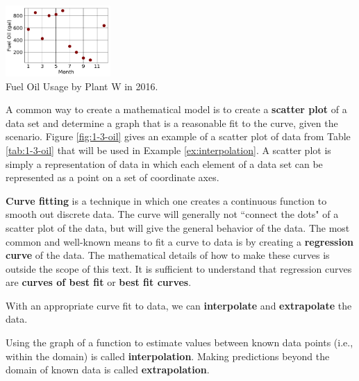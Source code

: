 \begin{floatingfigure}{0.3\textwidth}
    \centering
    \includegraphics[width=0.3\textwidth]{img/chap1/sec1-3/ex1-3-oil.png}\\
    \caption{Fuel Oil Usage by Plant W in 2016.}
    \label{fig:1-3-oil}
\end{floatingfigure}
A common way to create a mathematical model is to create a {\bf scatter plot} of a data set and determine a graph that is a reasonable fit to the curve, given the scenario. Figure \ref{fig:1-3-oil} gives an example of a scatter plot of data from Table \ref{tab:1-3-oil} that will be used in Example \ref{ex:interpolation}. A scatter plot is simply a representation of data in which each element of a data set can be represented as a point on a set of coordinate axes.

{\bf Curve fitting} is a technique in which one creates a continuous function to smooth out discrete data. The curve will generally not ``connect the dots" of a scatter plot of the data, but will give the general behavior of the data. The most common and well-known means to fit a curve to data is by creating a {\bf regression curve} of the data. The mathematical details of how to make these curves is outside the scope of this text. It is sufficient to understand that regression curves are {\bf curves of best fit} or {\bf best fit curves}.


With an appropriate curve fit to data, we can {\bf interpolate} and {\bf extrapolate} the data.

\begin{definition}
Using the graph of a function to estimate values between known data points (i.e., within the domain) is called {\bf interpolation}. Making predictions beyond the domain of known data is called {\bf extrapolation}.
\end{definition}

